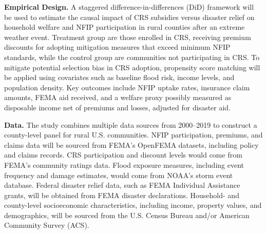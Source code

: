 \textbf{Empirical Design.} A staggered difference-in-differences (DiD) framework will be used to estimate the causal impact of CRS subsidies versus disaster relief on household welfare and NFIP participation in rural counties after an extreme weather event. Treatment group are those enrolled in CRS, receiving premium discounts for adopting mitigation measures that exceed minimum NFIP standards, while the control group are communities not participating in CRS. To mitigate potential selection bias in CRS adoption, propensity score matching will be applied using covariates such as baseline flood risk, income levels, and population density. Key outcomes include NFIP uptake rates, insurance claim amounts, FEMA aid received, and a welfare proxy possibly measured as disposable income net of premiums and losses, adjusted for disaster aid.

\textbf{Data.} The study combines multiple data sources from 2000–2019 to construct a county-level panel for rural U.S. communities. NFIP participation, premiums, and claims data will be sourced from FEMA’s OpenFEMA datasets, including policy and claims records. CRS participation and discount levels would come from FEMA’s community ratings data. Flood exposure measures, including event frequency and damage estimates, would come from NOAA’s storm event database. Federal disaster relief data, such as FEMA Individual Assistance grants, will be obtained from FEMA disaster declarations. Household- and county-level socioeconomic characteristics, including income, property values, and demographics, will be sourced from the U.S. Census Bureau and/or American Community Survey (ACS).





